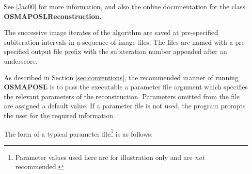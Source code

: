 \documentclass{article}
\begin{document}
See [Jac00] for more information, and also the online documentation 
for the class \textbf{OSMAPOSLReconstruction.}


The successive image iterates of the algorithm are saved at pre-specified 
subiteration intervals in a sequence of image files. The files 
are named with a pre-specified output file prefix with the subiteration 
number appended after an underscore.


As described in Section \ref{sec:conventions}, 
the recommended manner of running \textbf{OSMAPOSL} 
is to pass the executable a parameter file argument which specifies 
the relevant parameters of the reconstruction. Parameters omitted 
from the file are assigned a default value. If a parameter file 
is not used, the program prompts the user for the required information. 



The form of a typical parameter file\footnote{Parameter values used here are for
illustration only and are \textit{not} recommended.} is as follows:
\end{document}
